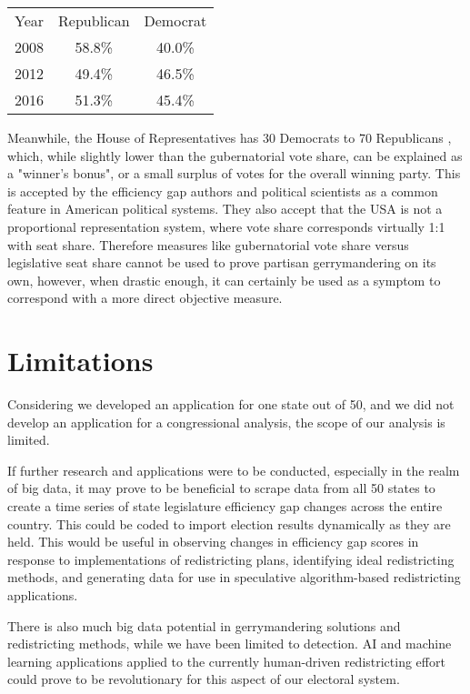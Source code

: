 \documentclass[sigconf]{acmart}
\begin{document}
\begin{center}
    \begin{tabular}{ |c|c|c| }
    \hline
    Year & Republican & Democrat \\
    2008 & 58.8\%  & 40.0\% \\
    2012 & 49.4\% & 46.5\% \\
    2016 & 51.3\% & 45.4\% \\
    \hline
    \end{tabular}
\end{center}
\cite{sos}
Meanwhile, the House of Representatives has 30 Democrats to 70 Republicans \cite{houseresults}, which, while slightly lower than the gubernatorial vote share, can be explained as a "winner's bonus", or a small surplus of votes for the overall winning party. This is accepted by the efficiency gap authors and political scientists as a common feature in American political systems. They also accept that the USA is not a proportional representation system, where vote share corresponds virtually 1:1 with seat share.\cite{chicagoformula} Therefore measures like gubernatorial vote share versus legislative seat share cannot be used to prove partisan gerrymandering on its own, however, when drastic enough, it can certainly be used as a symptom to correspond with a more direct objective measure.

\section{Limitations}
Considering we developed an application for one state out of 50, and we did not develop an application for a congressional analysis, the scope of our analysis is limited.

If further research and applications were to be conducted, especially in the realm of big data, it may prove to be beneficial to scrape data from all 50 states to create a time series of state legislature efficiency gap changes across the entire country. This could be coded to import election results dynamically as they are held. This would be useful in observing changes in efficiency gap scores in response to implementations of redistricting plans, identifying ideal redistricting methods, and generating data for use in speculative algorithm-based redistricting applications.

There is also much big data potential in gerrymandering solutions and redistricting methods, while we have been limited to detection. AI and machine learning applications applied to the currently human-driven redistricting effort could prove to be revolutionary for this aspect of our electoral system. 
\end{document}
